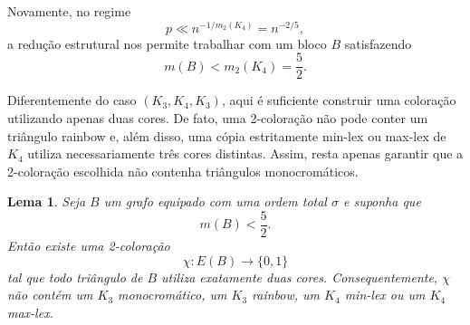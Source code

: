 \documentclass[reqno, 12pt]{amsart}
\numberwithin{equation}{section}
\theoremstyle{plain}
\newtheorem{lemma}[theorem]{Lema}
\theoremstyle{definition}
\begin{document}
Novamente, no regime
\[
  p\ll n^{-1/m_2(K_4)}
  =
  n^{-2/5},
\]
a redução estrutural nos permite trabalhar com um bloco $B$
satisfazendo
\[
  m(B)<m_2(K_4)=\frac52.
\]

Diferentemente do caso $(K_3,K_4,K_3)$, aqui é suficiente
construir uma coloração utilizando apenas duas cores. De fato,
uma 2-coloração não pode conter um triângulo rainbow e, além
disso, uma cópia estritamente min-lex ou max-lex de $K_4$
utiliza necessariamente três cores distintas. Assim, resta apenas
garantir que a 2-coloração escolhida não contenha triângulos
monocromáticos.

\begin{lemma}
  \label{lem:334-colouring}
  Seja $B$ um grafo equipado com uma ordem total $\sigma$ e
  suponha que
  \[
    m(B)<\frac52.
  \]
  Então existe uma 2-coloração
  \[
    \chi:E(B)\longrightarrow\{0,1\}
  \]
  tal que todo triângulo de $B$ utiliza exatamente duas cores.
  Consequentemente, $\chi$ não contém um $K_3$ monocromático,
  um $K_3$ rainbow, um $K_4$ min-lex ou um $K_4$ max-lex.
\end{lemma}
\end{document}
